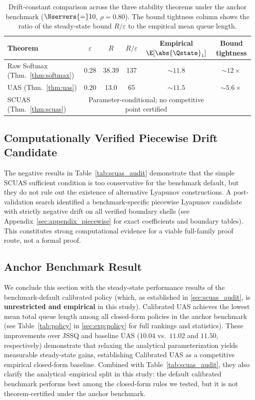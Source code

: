 \begin{table}[htbp]
\centering
\small
\caption{Drift-constant comparison across the three stability theorems under the anchor benchmark ($\Nservers{=}10$, $\rho{=}0.80$). The bound tightness column shows the ratio of the steady-state bound $R/\varepsilon$ to the empirical mean queue length.}
\label{tab:drift_comparison}
\renewcommand{\arraystretch}{1.25}
\begin{tabular}{@{}l c c c c c@{}}
\toprule
\textbf{Theorem} & $\varepsilon$ & $R$ & $R/\varepsilon$ & \textbf{Empirical} $\E[\abs{\Qstate}_1]$ & \textbf{Bound tightness} \\
\midrule
Raw Softmax (Thm.~\ref{thm:softmax}) & 0.28 & 38.39 & 137 & ${\sim}11.8$ & ${\sim}12\times$ \\
UAS (Thm.~\ref{thm:uas}) & 0.20 & 13.0 & 65 & ${\sim}11.5$ & ${\sim}5.6\times$ \\
SCUAS (Thm.~\ref{thm:scuas}) & \multicolumn{4}{c}{Parameter-conditional; no competitive point certified} \\
\bottomrule
\end{tabular}
\end{table}

\subsection{Computationally Verified Piecewise Drift Candidate}
\label{sec:caluas_piecewise_candidate}

The negative results in Table~\ref{tab:scuas_audit} demonstrate that the simple SCUAS sufficient condition is too conservative for the benchmark default, but they do not rule out the existence of alternative Lyapunov constructions. A post-validation search identified a benchmark-specific piecewise Lyapunov candidate with strictly negative drift on all verified boundary shells (see Appendix~\ref{sec:appendix_piecewise} for exact coefficients and boundary tables). This constitutes strong computational evidence for a viable full-family proof route, not a formal proof.

\subsection{Anchor Benchmark Result}
\label{sec:scuas_results}

We conclude this section with the steady-state performance results of the benchmark-default calibrated policy (which, as established in \cref{sec:scuas_audit}, is \textbf{unrestricted and empirical} in this study).
Calibrated UAS achieves the lowest mean total queue length among all closed-form policies in the anchor benchmark (see Table~\ref{tab:policy} in \cref{sec:exp:policy} for full rankings and statistics).
These improvements over JSSQ and baseline UAS ($10.04$ vs.\ $11.02$ and $11.50$, respectively) demonstrate that relaxing the analytical parameterization yields measurable steady-state gains, establishing Calibrated UAS as a competitive empirical closed-form baseline.
Combined with Table~\ref{tab:scuas_audit}, they also clarify the analytical--empirical split in this study: the default calibrated benchmark performs best among the closed-form rules we tested, but it is not theorem-certified under the anchor benchmark.
